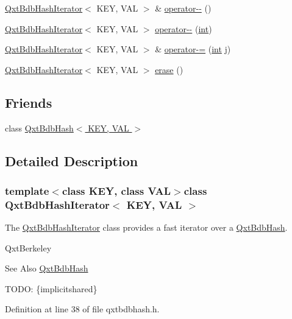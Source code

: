 \begin{DoxyCompactItemize}
\item 
\hyperlink{class_qxt_bdb_hash_iterator}{Qxt\-Bdb\-Hash\-Iterator}$<$ K\-E\-Y, V\-A\-L $>$ \& \hyperlink{class_qxt_bdb_hash_iterator_ac30cb1a6c783c424bad9c2fc89fb4959}{operator-\/-\/} ()
\item 
\hyperlink{class_qxt_bdb_hash_iterator}{Qxt\-Bdb\-Hash\-Iterator}$<$ K\-E\-Y, V\-A\-L $>$ \hyperlink{class_qxt_bdb_hash_iterator_af6a4f62c191aebc6fdfd373ef88fae38}{operator-\/-\/} (\hyperlink{ioapi_8h_a787fa3cf048117ba7123753c1e74fcd6}{int})
\item 
\hyperlink{class_qxt_bdb_hash_iterator}{Qxt\-Bdb\-Hash\-Iterator}$<$ K\-E\-Y, V\-A\-L $>$ \& \hyperlink{class_qxt_bdb_hash_iterator_a6347c08c4f1ea7e088d02b1281667dc7}{operator-\/=} (\hyperlink{ioapi_8h_a787fa3cf048117ba7123753c1e74fcd6}{int} j)
\item 
\hyperlink{class_qxt_bdb_hash_iterator}{Qxt\-Bdb\-Hash\-Iterator}$<$ K\-E\-Y, V\-A\-L $>$ \hyperlink{class_qxt_bdb_hash_iterator_aace6df192ee6a972143a3a37e765d141}{erase} ()
\end{DoxyCompactItemize}
\subsection*{Friends}
\begin{DoxyCompactItemize}
\item 
class \hyperlink{class_qxt_bdb_hash_iterator_a8df269b7a1a7efce25bebcb4e0bfc93c}{Qxt\-Bdb\-Hash$<$ K\-E\-Y, V\-A\-L $>$}
\end{DoxyCompactItemize}


\subsection{Detailed Description}
\subsubsection*{template$<$class K\-E\-Y, class V\-A\-L$>$class Qxt\-Bdb\-Hash\-Iterator$<$ K\-E\-Y, V\-A\-L $>$}

The \hyperlink{class_qxt_bdb_hash_iterator}{Qxt\-Bdb\-Hash\-Iterator} class provides a fast iterator over a \hyperlink{class_qxt_bdb_hash}{Qxt\-Bdb\-Hash}. 

Qxt\-Berkeley \begin{DoxySeeAlso}{See Also}
\hyperlink{class_qxt_bdb_hash}{Qxt\-Bdb\-Hash}
\end{DoxySeeAlso}
T\-O\-D\-O\-: \{implicitshared\} 

Definition at line 38 of file qxtbdbhash.\-h.



